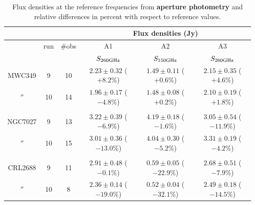 \begin{table}[th]
\begin{center}
\begin{tabular}{|c|c|c|c|c|c|}
\hline
\multicolumn{3}{|c}{}  & \multicolumn{3}{|c|}{Flux densities (Jy)}   \\
\hline
         & run  & \#obs &  A1                    &  A2                   &    A3                    \\
         &      &      &  $S_{260 {\rm GHz}}$     &  $S_{150 {\rm GHz}}$  & $S_{260 {\rm GHz}}$    \\
\hline
MWC349   &  9   & 10  &  $2.23\pm0.32$  ($+8.2\%$)  &  $1.49\pm0.11$ ($+0.6\%$) &  $2.15\pm0.35$ ($+4.6\%$)      \\
  $''$   & 10   & 14  &  $1.96\pm0.17$  ($-4.8\%$)  &  $1.48\pm0.08$ ($+0.2\%$) &  $2.10\pm0.19$ ($+1.8\%$)                  \\
         &      &     &                             &                           &                            \\
NGC7027  &  9   & 13  &  $3.22\pm0.39$  ($-6.9\%$)  &  $4.19\pm0.18$ ($-1.6\%$) & $3.05\pm0.54$  ($-11.9\%$)      \\
  $''$   & 10   & 15  &  $3.01\pm0.36$  ($-13.0\%$) &  $4.04\pm0.30$ ($-5.2\%$) & $3.31\pm0.19$  ($-4.2\%$)                   \\
         &      &     &                             &                           &                                 \\
CRL2688  &  9   & 11  &  $2.91\pm0.48$  ($-0.1\%$)  &  $0.59\pm0.05$ ($-22.9\%$)  &  $2.68\pm0.51$ ($-7.9\%$)     \\
  $''$   & 10   &  8  &  $2.36\pm0.14$  ($-19.0\%$) &  $0.52\pm0.04$ ($-32.1\%$)  &  $2.49\pm0.18$ ($-14.5\%$)                   \\
\hline
\end{tabular}
\caption{Flux densities at the reference frequencies from {\bf aperture photometry} and relative differences in percent with respect to reference values.}
\end{center}
\label{tab:flux_sec_Ap}
\end{table}


